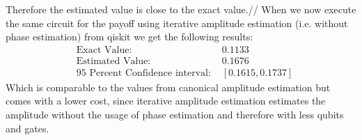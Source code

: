 \documentclass[../main.tex]{subfiles}
\begin{document}
Therefore the estimated value is close to the exact value.//
When we now execute the same circuit for the payoff using iterative amplitude estimation \cite{Grinko_2021}  (i.e. without phase estimation) from qiskit we get the following results:
\begin{align}
    &\text{Exact Value: } &0.1133\\
    &\text{Estimated Value: } &0.1676\\
    &\text{95 Percent Confidence interval:	} &[0.1615, 0.1737]
\end{align}
Which is comparable to the values from canonical amplitude estimation but comes with a lower cost, since iterative amplitude estimation estimates the amplitude without the usage of phase estimation and therefore with less qubits and gates.
\biblio
\end{document}
